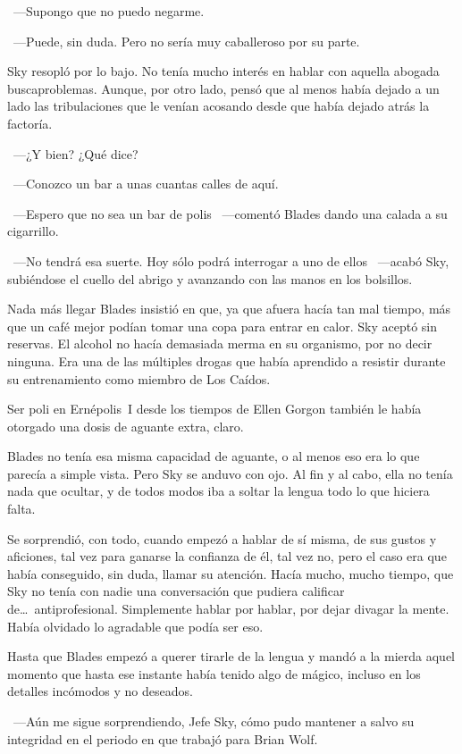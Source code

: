 ~---Supongo que no puedo negarme.

~---Puede, sin duda. Pero no sería muy caballeroso por su parte.

Sky resopló por lo bajo. No tenía mucho interés en hablar con aquella abogada buscaproblemas. Aunque, por otro lado, pensó que al menos había dejado a un lado las tribulaciones que le venían acosando desde que había dejado atrás la factoría.

~---¿Y bien? ¿Qué dice?

~---Conozco un bar a unas cuantas calles de aquí.

~---Espero que no sea un bar de polis ~---comentó Blades dando una calada a su cigarrillo.

~---No tendrá esa suerte. Hoy sólo podrá interrogar a uno de ellos ~---acabó Sky, subiéndose el cuello del abrigo y avanzando con las manos en los bolsillos.

\bigskip\noindent
Nada más llegar Blades insistió en que, ya que afuera hacía tan mal tiempo, más que un café mejor podían tomar una copa para entrar en calor. Sky aceptó sin reservas. El alcohol no hacía demasiada merma en su organismo, por no decir ninguna. Era una de las múltiples drogas que había aprendido a resistir durante su entrenamiento como miembro de Los Caídos.

Ser poli en Ernépolis~I desde los tiempos de Ellen Gorgon también le había otorgado una dosis de aguante extra, claro.

Blades no tenía esa misma capacidad de aguante, o al menos eso era lo que parecía a simple vista. Pero Sky se anduvo con ojo. Al fin y al cabo, ella no tenía nada que ocultar, y de todos modos iba a soltar la lengua todo lo que hiciera falta.

Se sorprendió, con todo, cuando empezó a hablar de sí misma, de sus gustos y aficiones, tal vez para ganarse la confianza de él, tal vez no, pero el caso era que había conseguido, sin duda, llamar su atención. Hacía mucho, mucho tiempo, que Sky no tenía con nadie una conversación que pudiera calificar de\dots\ antiprofesional. Simplemente hablar por hablar, por dejar divagar la mente. Había olvidado lo agradable que podía ser eso.

Hasta que Blades empezó a querer tirarle de la lengua y mandó a la mierda aquel momento que hasta ese instante había tenido algo de mágico, incluso en los detalles incómodos y no deseados.

~---Aún me sigue sorprendiendo, Jefe Sky, cómo pudo mantener a salvo su integridad en el periodo en que trabajó para Brian Wolf.

